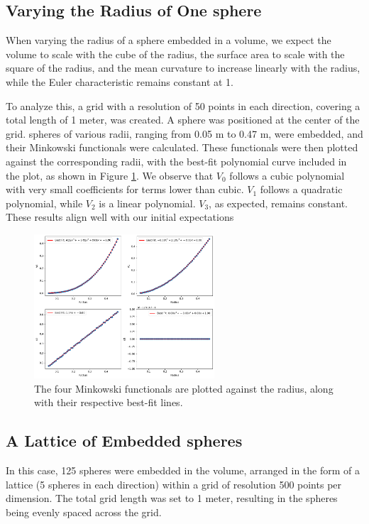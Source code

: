\documentclass{article}
\begin{document}
\subsection{Varying the Radius of One sphere}
When varying the radius of a sphere embedded in a volume, we expect the volume to scale with the cube of the radius, the surface area to scale with the square of the radius, and the mean curvature to increase linearly with the radius, while the Euler characteristic remains constant at 1.

To analyze this, a grid with a resolution of 50 points in each direction, covering a total length of 1 meter, was created. A sphere was positioned at the center of the grid. spheres of various radii, ranging from 0.05 m to 0.47 m, were embedded, and their Minkowski functionals were calculated. These functionals were then plotted against the corresponding radii, with the best-fit polynomial curve included in the plot, as shown in Figure \ref{fig:single_sphere_plot}. We observe that \(V_0\) follows a cubic polynomial with very small coefficients for terms lower than cubic. \(V_1\) follows a quadratic polynomial, while \(V_2\) is a linear polynomial. \(V_3\), as expected, remains constant. These results align well with our initial expectations

\begin{figure}[h!]
    \centering
    \includegraphics[width=0.6\textwidth]{Images/single_sphere_radius_variance.png}
    \caption{The four Minkowski functionals are plotted against the radius, along with their respective best-fit lines.}
    \label{fig:single_sphere_plot}
\end{figure}


\subsection{A Lattice of Embedded spheres}
In this case, 125 spheres were embedded in the volume, arranged in the form of a lattice (5 spheres in each direction) within a grid of resolution 500 points per dimension. The total grid length was set to 1 meter, resulting in the spheres being evenly spaced across the grid.
\end{document}
